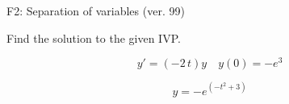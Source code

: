 \begin{exercise}
  \begin{exerciseTitle}F2: Separation of variables (ver. 99)\end{exerciseTitle}
  \begin{exerciseStatement}
    
Find the solution to the given IVP.

    
\[y'=( -2 \, t )y\hspace{1em} y(0)= -e^{3}\]

  \end{exerciseStatement}
  \begin{exerciseAnswer}
    
\[y= -e^{\left(-t^{2} + 3\right)}\]

  \end{exerciseAnswer}
\end{exercise}